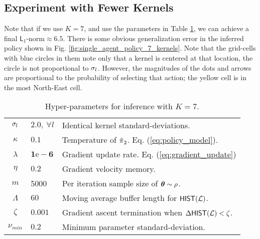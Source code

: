         \begin{figure}[H]
        \begin{center}
        \end{center}
        \end{figure}

    \subsection{Experiment with Fewer Kernels}

        Note that if we use $K=7$, and use the parameters in Table \ref{table:single_agent_new_hyper_params}, we can
        achieve a final $\mathsf{L}_1\text{-norm} \approx 6.5$. There is some obvious generalization error in the
        inferred policy shown in Fig. \ref{fig:single_agent_policy_7_kernels}. Note that the grid-cells with blue
        circles in them note only that a kernel is centered at that location, the circle is not proportional to
        $\sigma_{l}$. However, the magnitudes of the dots and arrows are proportional to the probability of
        selecting that action; the yellow cell is in the most North-East cell.

    \begin{table}[H]
        \centering
        \begin{tabular}{c|l l}
                $\sigma_{l}$ & $\mathbf{2.0},\ \forall l$ & Identical kernel standard-deviations.\\
                $\kappa$ & $0.1$ & Temperature of $\hat{\pi_{}}_2$. Eq. (\ref{eq:policy_model}). \\
                $\lambda$ & $\mathbf{1\mathrm{e}\!-\!6}$ & Gradient update rate. Eq. (\ref{eq:gradient_update}) \\
                $\eta$ & $\mathbf{0.2}$ & Gradient velocity memory.\\
                $m$ & 5000 & Per iteration sample size of $\boldsymbol{\mathbb{\theta}}\sim \rho$.\\
                $\Lambda$ & $60$ & Moving average buffer length for $\mathsf{HIST}(\mathcal{L})$. \\
                $\zeta$ & $0.001$ & Gradient ascent termination when $\Delta\mathsf{HIST}(\mathcal{L}) < \zeta$.\\
                $\nu_{min}$ & $0.2$ & Minimum parameter standard-deviation.\\
        \end{tabular}
        \caption{Hyper-parameters for inference with $K=7$.}
        \label{table:single_agent_new_hyper_params}
    \end{table}

